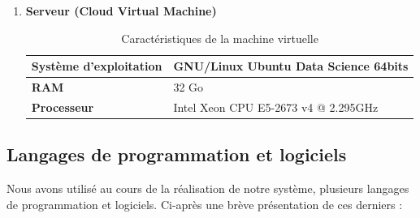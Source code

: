 \begin{enumerate}
        \item{\textbf{Serveur (Cloud Virtual Machine)}}
        \begin{table}[h!]
            \begin{center}
                \begin{tabular}{|C{5cm}|C{8cm}|}
                    \hline
                    \textbf{Système d'exploitation} &  GNU/Linux Ubuntu Data Science 64bits \\
                    \hline
                    \textbf{RAM} &  32 Go \\
                    \hline
                    \textbf{Processeur} & Intel Xeon CPU E5-2673 v4 @ 2.295GHz \\
                    \hline
                \end{tabular}
            \end{center}
        \caption{Caractéristiques de la machine virtuelle}
        \end{table}
    \end{enumerate}   

    \subsection{Langages de programmation et logiciels}
    Nous avons utilisé au cours de la réalisation de notre système, plusieurs langages de programmation et logiciels. Ci-après une brève présentation de ces derniers :
